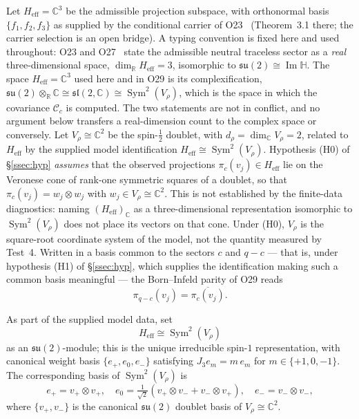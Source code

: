 \documentclass[11pt,a4paper]{article}
\DeclareMathOperator{\Sym}{Sym}
\newcommand{\Heff}{H_{\mathrm{eff}}}
\newcommand{\Cc}{\mathcal{C}_c}
\begin{document}
  Let $\Heff = \mathbb{C}^3$ be the admissible projection subspace, with orthonormal basis
  $\{f_1, f_2, f_3\}$ as supplied by the conditional carrier of O23~\cite{Beau2026a27}
  (Theorem~3.1 there; the carrier selection is an open bridge).
  A typing convention is fixed here and used throughout: O23 and O27~\cite{Beau2026a31} state the
  admissible neutral traceless sector as a \emph{real} three-dimensional space,
  $\dim_{\mathbb{R}} H_{\mathrm{eff}} = 3$, isomorphic to $\mathfrak{su}(2) \cong \operatorname{Im}
  \mathbb{H}$.
  The space $\Heff = \mathbb{C}^3$ used here and in O29 is its complexification,
  $\mathfrak{su}(2) \otimes_{\mathbb{R}} \mathbb{C} \cong \mathfrak{sl}(2,\mathbb{C}) \cong
  \Sym^2(V_\rho)$, which is the space in which the covariance $\Cc$ is computed.
  The two statements are not in conflict, and no argument below transfers a real-dimension count to
  the complex space or conversely.
  Let $V_\rho \cong \mathbb{C}^2$ be the spin-$\tfrac{1}{2}$ doublet, with $d_\rho = \dim_{\mathbb{C}} V_\rho = 2$,
  related to $\Heff$ by the supplied model identification $\Heff \cong \Sym^2(V_\rho)$.
  Hypothesis (H0) of \S\ref{ssec:hyp} \emph{assumes} that the observed projections
  $\pi_c(v_j) \in \Heff$ lie on the Veronese cone of rank-one symmetric squares of a doublet, so
  that $\pi_c(v_j) = w_j \otimes w_j$ with $w_j \in V_\rho \cong \mathbb{C}^2$.
  This is not established by the finite-data diagnostics: naming $(\Heff)_{\mathbb{C}}$ as a
  three-dimensional representation isomorphic to $\Sym^2(V_\rho)$ does not place its vectors on that
  cone.
  Under (H0), $V_\rho$ is the square-root coordinate system of the model, not the quantity measured
  by Test~4.
  Written in a basis common to the sectors $c$ and $q-c$ --- that is, under hypothesis (H1) of
  \S\ref{ssec:hyp}, which supplies the identification making such a common basis meaningful ---
  the Born--Infeld parity of O29 reads
  \begin{equation}
    \label{eq:parity-equality}
    \pi_{q-c}(v_j) = \overline{\pi_c(v_j)} .
  \end{equation}

  As part of the supplied model data, set
  \begin{equation}
    \label{eq:sym2}
    \Heff \cong \Sym^2(V_\rho)
  \end{equation}
  as an $\mathfrak{su}(2)$-module; this is the unique irreducible spin-$1$ representation,
  with canonical weight basis $\{e_+, e_0, e_-\}$ satisfying $J_3 e_m = m\, e_m$ for
  $m \in \{+1, 0, -1\}$.
  The corresponding basis of $\Sym^2(V_\rho)$ is
  \begin{equation}
    \label{eq:sym2basis}
    e_+ = v_+ \otimes v_+, \quad
    e_0 = \tfrac{1}{\sqrt{2}}(v_+ \otimes v_- + v_- \otimes v_+), \quad
    e_- = v_- \otimes v_-,
  \end{equation}
  where $\{v_+, v_-\}$ is the canonical $\mathfrak{su}(2)$ doublet basis of $V_\rho \cong \mathbb{C}^2$.
\end{document}
